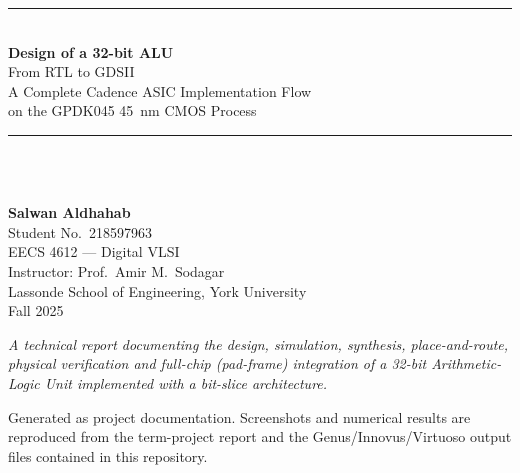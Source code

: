 \documentclass[11pt,a4paper,oneside]{report}
\begin{document}
\begin{titlepage}
  \centering
  \vspace*{1.2cm}
  {\color{accent}\rule{\linewidth}{1.4pt}}\\[4pt]
  {\Huge\bfseries Design of a 32-bit ALU}\\[10pt]
  {\LARGE From RTL to GDSII}\\[8pt]
  {\large A Complete Cadence ASIC Implementation Flow\\
   on the GPDK045 \SI{45}{\nano\meter} CMOS Process}\\[6pt]
  {\color{accent}\rule{\linewidth}{1.4pt}}\\[1.4cm]

  \\[1.4cm]

  {\large\bfseries Salwan Aldhahab}\\[2pt]
  {\normalsize Student No.\ 218597963}\\[10pt]
  {\normalsize EECS 4612 --- Digital VLSI}\\[2pt]
  {\normalsize Instructor: Prof.\ Amir M.\ Sodagar}\\[2pt]
  {\normalsize Lassonde School of Engineering, York University}\\[2pt]
  {\normalsize Fall 2025}\\[1.0cm]

  \begin{minipage}{0.86\linewidth}\small\itshape\color{black!70}\centering
    A technical report documenting the design, simulation, synthesis,
    place-and-route, physical verification and full-chip (pad-frame)
    integration of a 32-bit Arithmetic-Logic Unit implemented with a
    bit-slice architecture.
  \end{minipage}

  \vfill
  {\footnotesize Generated as project documentation. Screenshots and
   numerical results are reproduced from the term-project report and the
   Genus/Innovus/Virtuoso output files contained in this repository.}
\end{titlepage}
\end{document}
